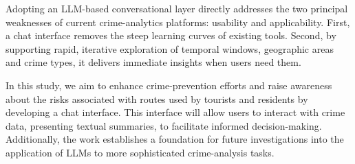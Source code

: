 


Adopting an LLM-based conversational layer directly addresses the two principal weaknesses of current crime-analytics platforms: usability and applicability. First, a chat interface removes the steep learning curves of existing tools. Second, by supporting rapid, iterative exploration of temporal windows, geographic areas and crime types, it delivers immediate insights when users need them.

In this study, we aim to enhance crime-prevention efforts and raise awareness about the risks associated with routes used by tourists and residents by developing a chat interface. This interface will allow users to interact with crime data, presenting textual summaries, to facilitate informed decision-making. Additionally, the work establishes a foundation for future investigations into the application of LLMs to more sophisticated crime-analysis tasks. %

